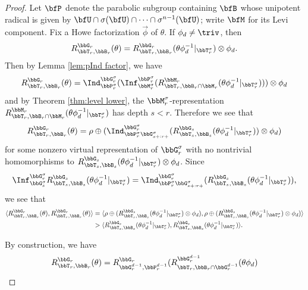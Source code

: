 \begin{proof}
  Let $\bfP$ denote the parabolic subgroup containing $\bfB$ whose unipotent radical is given by $\bfU \cap \sigma(\bfU) \cap \cdots \cap \sigma^{n-1}(\bfU)$; write $\bfM$ for its Levi component. Fix a Howe factorization $\vec \phi$ of $\theta$. If $\phi_d \neq \triv$, then
  \begin{equation*}
    R_{\bbT_r,\bbB_r}^{\bbG_r}(\theta) = R_{\bbT_r,\bbB_r}^{\bbG_r}(\theta \phi_d^{-1}|_{\bbT_r^\sigma}) \otimes \phi_d.
  \end{equation*}
  Then by Lemma \ref{lem:pInd factor}, we have
  \begin{equation*}
    R_{\bbT_r,\bbB_r}^{\bbG_r}(\theta) = \Ind_{\bbP_r^\sigma}^{\bbG_r^\sigma}(\Inf_{\bbM_r^\sigma}^{\bbP_r^\sigma}(R_{\bbT_r, \bbB_r \cap \bbM_r}^{\bbM_r}( \theta \phi_d^{-1}|_{\bbT_r^\sigma}))) \otimes \phi_d
  \end{equation*}
  and by Theorem \ref{thm:level lower}, the $\bbM_r^\sigma$-representation $R_{\bbT_r,\bbB_r \cap \bbM_r}^{\bbM_r}(\theta \phi_d^{-1}|_{\bbT_r^\sigma})$ has depth $s < r$. Therefore we see that
  \begin{equation*}
    R_{\bbT_r,\bbB_r}^{\bbG_r}(\theta) = \rho \oplus (\Ind_{\bbP_r^\sigma \bbG_{s+:r+}^\sigma}^{\bbG_r^\sigma}(R_{\bbT_s,\bbB_s}^{\bbG_s}(\theta \phi_d^{-1}|_{\bbT_r^\sigma})) \otimes \phi_d)
  \end{equation*}
  for some nonzero virtual representation of $\bbG_r^\sigma$ with no nontrivial homomorphisms to $R_{\bbT_s,\bbB_s}^{\bbG_s}(\theta \phi_d^{-1}|_{\bbT_r^\sigma}) \otimes \phi_d$. Since
  \begin{equation*}
    \Inf_{\bbG_s^\sigma}^{\bbG_r^\sigma} R_{\bbT_s,\bbB_s}^{\bbG_s}(\theta \phi_d^{-1}|_{\bbT_r^\sigma}) = \Ind_{\bbP_r^\sigma \bbG_{s+:r+}^\sigma}^{\bbG_r^\sigma}(R_{\bbT_s,\bbB_s}^{\bbG_s}(\theta \phi_d^{-1}|_{\bbT_r^\sigma})),
  \end{equation*}
  we see that
  \begin{align*}
    \langle R_{\bbT_r,\bbB_r}^{\bbG_r}(\theta), R_{\bbT_r,\bbB_r}^{\bbG_r}(\theta) \rangle &= \langle \rho \oplus (R_{\bbT_s,\bbB_s}^{\bbG_s}(\theta \phi_d^{-1}|_{\bbT_r^\sigma}) \otimes \phi_d), \rho \oplus (R_{\bbT_s,\bbB_s}^{\bbG_s}(\theta \phi_d^{-1}|_{\bbT_r^\sigma}) \otimes \phi_d) \rangle \\
    &> \langle R_{\bbT_s,\bbB_s}^{\bbG_s}(\theta \phi_d^{-1}|_{\bbT_r^\sigma}), R_{\bbT_s,\bbB_s}^{\bbG_s}(\theta \phi_d^{-1}|_{\bbT_r^\sigma}) \rangle.
  \end{align*}
  
  
  By construction, we have
  \begin{equation*}
    R_{\bbT_r,\bbB_r}^{\bbG_r}(\theta) = R_{\bbG_r^{d-1},\bbP_r^{d-1}}^{\bbG_r}(R_{\bbT_r,\bbB_r \cap \bbG_r^{d-1}}^{\bbG_r^{d-1}}(\theta \phi_d)
  \end{equation*}
\end{proof}


